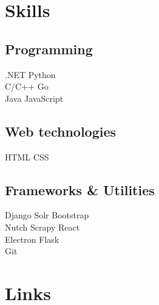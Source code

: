 \documentclass[a4paper]{deedy-resume-openfont}
\begin{document}
\begin{minipage}[t]{0.36\textwidth}

\section{Skills}
\subsection{Programming}
\textbullet{} .NET \textbullet{} Python \\
\textbullet{} C/C++ \textbullet{} Go \\
\textbullet{} Java \textbullet{} JavaScript \\
\sectionsep
\subsection{Web technologies}
\textbullet{} HTML \textbullet{} CSS \\
\sectionsep
\subsection{Frameworks \& Utilities}
\textbullet{} Django \textbullet{} Solr \textbullet{} Bootstrap \\
\textbullet{} Nutch \textbullet{} Scrapy \textbullet{} React \\
\textbullet{} Electron \textbullet{} Flask \\
\textbullet{} Git 
\sectionsep

\section{Links} 
\sectionsep

\end{minipage} 
\end{document}
